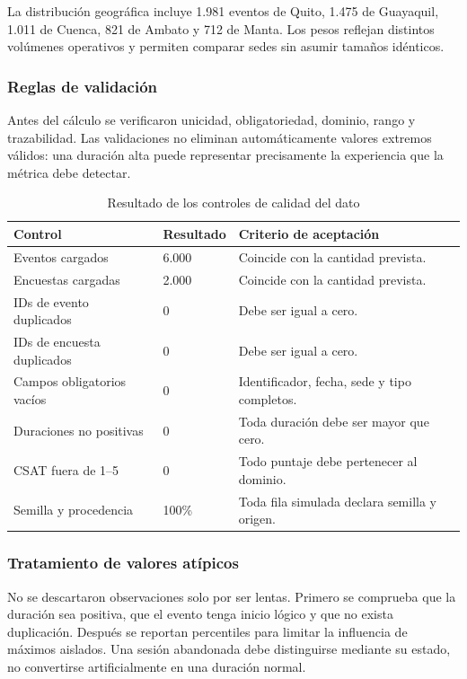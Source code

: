 La distribución geográfica incluye 1.981 eventos de Quito, 1.475 de Guayaquil, 1.011 de Cuenca, 821 de Ambato y 712 de Manta. Los pesos reflejan distintos volúmenes operativos y permiten comparar sedes sin asumir tamaños idénticos.

\subsubsection{Reglas de validación}

Antes del cálculo se verificaron unicidad, obligatoriedad, dominio, rango y trazabilidad. Las validaciones no eliminan automáticamente valores extremos válidos: una duración alta puede representar precisamente la experiencia que la métrica debe detectar.

\begin{table}[H]
\centering
\caption{Resultado de los controles de calidad del dato}
\label{tab:data-validation}
\begin{tabularx}{\textwidth}{p{4.7cm}p{2.1cm}Y}
\toprule
Control & Resultado & Criterio de aceptación \\
\midrule
Eventos cargados & 6.000 & Coincide con la cantidad prevista. \\
Encuestas cargadas & 2.000 & Coincide con la cantidad prevista. \\
IDs de evento duplicados & 0 & Debe ser igual a cero. \\
IDs de encuesta duplicados & 0 & Debe ser igual a cero. \\
Campos obligatorios vacíos & 0 & Identificador, fecha, sede y tipo completos. \\
Duraciones no positivas & 0 & Toda duración debe ser mayor que cero. \\
CSAT fuera de 1--5 & 0 & Todo puntaje debe pertenecer al dominio. \\
Semilla y procedencia & 100\% & Toda fila simulada declara semilla y origen. \\
\bottomrule
\end{tabularx}
\end{table}

\subsubsection{Tratamiento de valores atípicos}

No se descartaron observaciones solo por ser lentas. Primero se comprueba que la duración sea positiva, que el evento tenga inicio lógico y que no exista duplicación. Después se reportan percentiles para limitar la influencia de máximos aislados. Una sesión abandonada debe distinguirse mediante su estado, no convertirse artificialmente en una duración normal.

